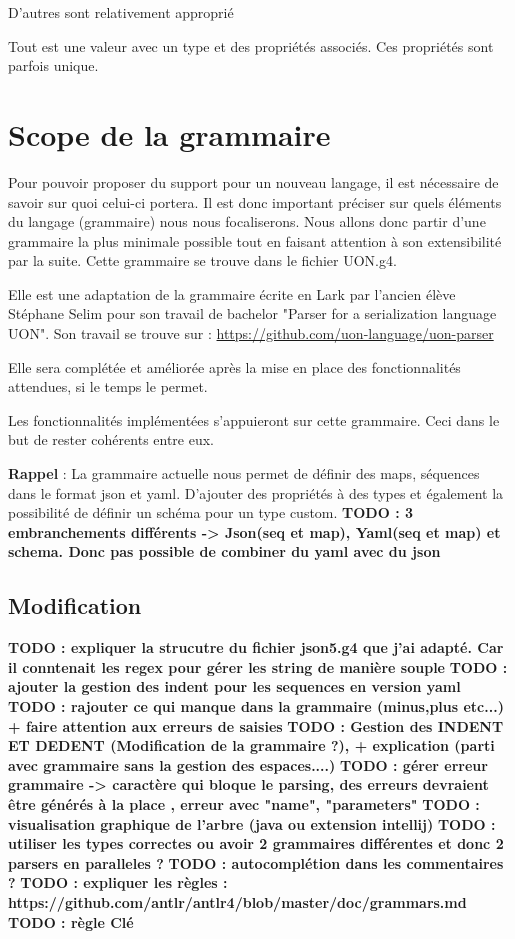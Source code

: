 \documentclass[
    iict, %
    il, %
]{heig-tb}
\begin{document}
D'autres sont relativement approprié

Tout est une valeur avec un type et des propriétés associés. Ces propriétés sont parfois unique.




\chapter{Scope de la grammaire}\label{grammar scope}
Pour pouvoir proposer du support pour un nouveau langage, il est nécessaire de savoir sur quoi celui-ci portera. Il est donc important préciser sur quels éléments du langage (grammaire) nous nous focaliserons.
Nous allons donc partir d'une grammaire la plus minimale possible tout en faisant attention à son extensibilité par la suite.
Cette grammaire se trouve dans le fichier UON.g4.

Elle est une adaptation de la grammaire écrite en Lark par l'ancien élève Stéphane Selim pour son travail de bachelor "Parser for a serialization language UON". Son travail se trouve sur :
\href{https://github.com/uon-language/uon-parser}{https://github.com/uon-language/uon-parser}

Elle sera complétée et améliorée après la mise en place des fonctionnalités attendues, si le temps le permet.

Les fonctionnalités implémentées s'appuieront sur cette grammaire. Ceci dans le but de rester cohérents entre eux.

\textbf{Rappel} :
La grammaire actuelle nous permet de définir des maps, séquences dans le format json et yaml. D'ajouter des propriétés à des types et également la possibilité de définir un schéma pour un type custom.
\textbf{TODO : 3 embranchements différents -> Json(seq et map), Yaml(seq et map) et schema. Donc pas possible de combiner du yaml avec du json}

\section{Modification}
\textbf{TODO : expliquer la strucutre du fichier json5.g4 que j'ai adapté. Car il conntenait les regex pour gérer les string de manière souple}
\textbf{TODO : ajouter la gestion des indent pour les sequences en version yaml }
\textbf{TODO : rajouter ce qui manque dans la grammaire (minus,plus etc...) + faire attention aux erreurs de saisies}
\textbf{TODO : Gestion des INDENT ET DEDENT (Modification de la grammaire ?), + explication (parti avec grammaire sans la gestion des espaces....)}
\textbf{TODO : gérer erreur grammaire -> caractère qui bloque le parsing, des erreurs devraient être générés à la place , erreur avec "name", "parameters"}
\textbf{TODO : visualisation graphique de l'arbre (java ou extension intellij)}
\textbf{TODO : utiliser les types correctes ou avoir 2 grammaires différentes et donc 2 parsers en paralleles ?}
\textbf{TODO : autocomplétion dans les commentaires ?}
\textbf{TODO : expliquer les règles : https://github.com/antlr/antlr4/blob/master/doc/grammars.md}
\textbf{TODO : règle Clé}
\end{document}
